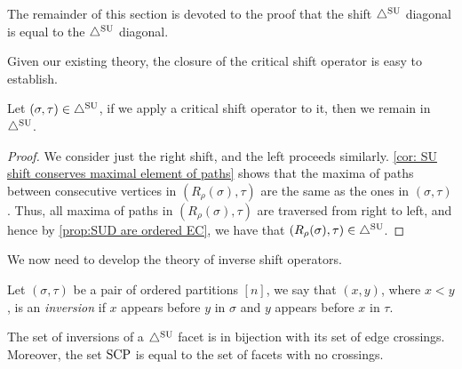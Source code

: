 The remainder of this section is devoted to the proof that the shift $\triangle^{\mathrm{SU}}$ diagonal is equal to the $\triangle^{\mathrm{SU}}$ diagonal. 

Given our existing theory, the closure of the critical shift operator is easy to establish.
\begin{lemma} \label{lem:SUD closed under shifts}
Let $(\sigma,\tau)\in \triangle^{\mathrm{SU}}$, if we apply a critical shift operator to it, then we remain in $\triangle^{\mathrm{SU}}$.
\end{lemma}
\begin{proof}
We consider just the right shift, and the left proceeds similarly. 
\cref{cor: SU shift conserves maximal element of paths} shows that the maxima of paths between consecutive vertices in $(R_{\rho}(\sigma),\tau)$ are the same as the ones in $(\sigma,\tau)$. 
Thus, all maxima of paths in $(R_{\rho}(\sigma),\tau)$ are traversed from right to left, and hence by \cref{prop:SUD are ordered EC}, we have that $(R_{\rho}(\sigma),\tau) \in \triangle^{\mathrm{SU}}$.   
\end{proof}

We now need to develop the theory of inverse shift operators.

\begin{definition}
Let $(\sigma,\tau)$ be a pair of ordered partitions $[n]$, we say that $(x,y)$, where $x<y$, is an \emph{inversion} if $x$ appears before $y$ in $\sigma$ and $y$ appears before $x$ in $\tau$. 
\end{definition}

\begin{proposition}
\label{p:crossings}
The set of inversions of a $\triangle^{\mathrm{SU}}$ facet is in bijection with its set of edge crossings. 
Moreover, the set $\mathrm{SCP}$ is equal to the set of facets with no crossings.
\end{proposition}

